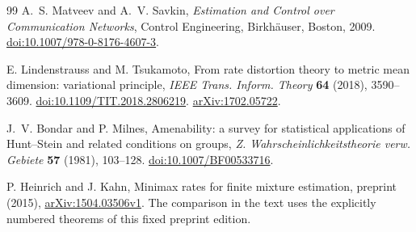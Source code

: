 \begin{thebibliography}{99}
A.~S. Matveev and A.~V. Savkin, \emph{Estimation and Control over
Communication Networks}, Control Engineering, Birkh\"auser, Boston, 2009.
\href{https://doi.org/10.1007/978-0-8176-4607-3}{doi:10.1007/978-0-8176-4607-3}.

E. Lindenstrauss and M. Tsukamoto, From rate distortion theory to
metric mean dimension: variational principle,
\emph{IEEE Trans. Inform. Theory} \textbf{64} (2018), 3590--3609.
\href{https://doi.org/10.1109/TIT.2018.2806219}{doi:10.1109/TIT.2018.2806219}.
\href{https://arxiv.org/abs/1702.05722}{arXiv:1702.05722}.

J.~V. Bondar and P. Milnes, Amenability: a survey for statistical
applications of Hunt--Stein and related conditions on groups,
\emph{Z. Wahrscheinlichkeitstheorie verw. Gebiete} \textbf{57}
(1981), 103--128.
\href{https://doi.org/10.1007/BF00533716}{doi:10.1007/BF00533716}.

P. Heinrich and J. Kahn, Minimax rates for finite mixture estimation,
preprint (2015), \href{https://arxiv.org/abs/1504.03506v1}{arXiv:1504.03506v1}.
The comparison in the text uses the explicitly numbered theorems
of this fixed preprint edition.

\end{thebibliography}

